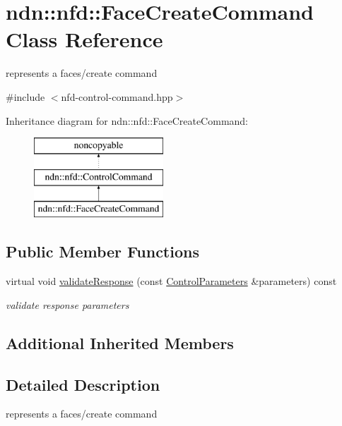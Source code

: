 \hypertarget{classndn_1_1nfd_1_1FaceCreateCommand}{}\section{ndn\+:\+:nfd\+:\+:Face\+Create\+Command Class Reference}
\label{classndn_1_1nfd_1_1FaceCreateCommand}


represents a faces/create command  




{\ttfamily \#include $<$nfd-\/control-\/command.\+hpp$>$}

Inheritance diagram for ndn\+:\+:nfd\+:\+:Face\+Create\+Command\+:\begin{figure}[H]
\begin{center}
\leavevmode
\includegraphics[height=3.000000cm]{classndn_1_1nfd_1_1FaceCreateCommand}
\end{center}
\end{figure}
\subsection*{Public Member Functions}
\begin{DoxyCompactItemize}
\item 
virtual void \hyperlink{classndn_1_1nfd_1_1FaceCreateCommand_a4863aa04cc67d85d285eb40a38633ef4}{validate\+Response} (const \hyperlink{classndn_1_1nfd_1_1ControlParameters}{Control\+Parameters} \&parameters) const
\begin{DoxyCompactList}\small\item\em validate response parameters \end{DoxyCompactList}\end{DoxyCompactItemize}
\subsection*{Additional Inherited Members}


\subsection{Detailed Description}
represents a faces/create command 

